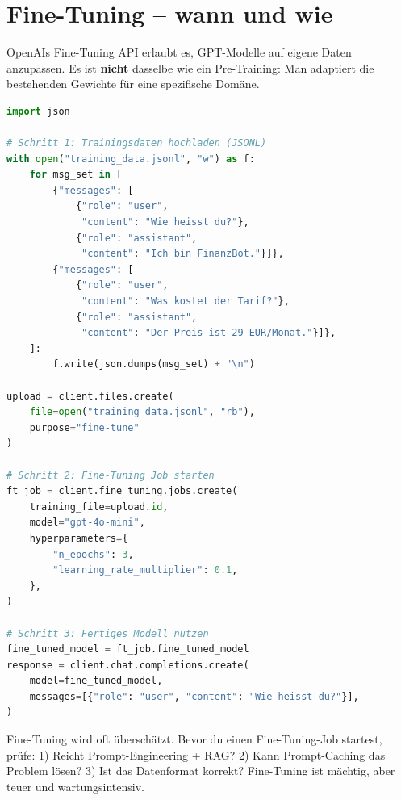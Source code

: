 \section{Fine-Tuning -- wann und wie}

OpenAIs Fine-Tuning API erlaubt es, GPT-Modelle auf eigene Daten anzupassen. Es ist \textbf{nicht} dasselbe wie ein Pre-Training: Man adaptiert die bestehenden Gewichte für eine spezifische Domäne.

\begin{lstlisting}[language=Python, caption={Fine-Tuning mit OpenAI}, label=lst:finetune]
import json

# Schritt 1: Trainingsdaten hochladen (JSONL)
with open("training_data.jsonl", "w") as f:
    for msg_set in [
        {"messages": [
            {"role": "user",
             "content": "Wie heisst du?"},
            {"role": "assistant",
             "content": "Ich bin FinanzBot."}]},
        {"messages": [
            {"role": "user",
             "content": "Was kostet der Tarif?"},
            {"role": "assistant",
             "content": "Der Preis ist 29 EUR/Monat."}]},
    ]:
        f.write(json.dumps(msg_set) + "\n")

upload = client.files.create(
    file=open("training_data.jsonl", "rb"),
    purpose="fine-tune"
)

# Schritt 2: Fine-Tuning Job starten
ft_job = client.fine_tuning.jobs.create(
    training_file=upload.id,
    model="gpt-4o-mini",
    hyperparameters={
        "n_epochs": 3,
        "learning_rate_multiplier": 0.1,
    },
)

# Schritt 3: Fertiges Modell nutzen
fine_tuned_model = ft_job.fine_tuned_model
response = client.chat.completions.create(
    model=fine_tuned_model,
    messages=[{"role": "user", "content": "Wie heisst du?"}],
)
\end{lstlisting}

\begin{praxishinweis}
Fine-Tuning wird oft überschätzt. Bevor du einen Fine-Tuning-Job startest, prüfe: 1) Reicht Prompt-Engineering + RAG? 2) Kann Prompt-Caching das Problem lösen? 3) Ist das Datenformat korrekt? Fine-Tuning ist mächtig, aber teuer und wartungsintensiv.
\end{praxishinweis}

